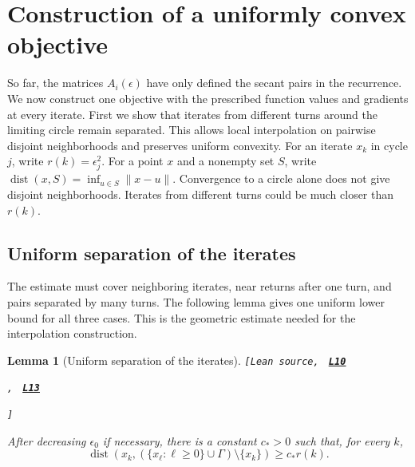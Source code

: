 \documentclass[11pt]{article}
\newtheorem{lemma}[theorem]{Lemma}
\newcommand{\leanLinkText}[1]{%
  \underline{\textbf{#1}}%
}
\newcommand{\leanSnapshot}{e308927f5b7930bdd002f0c0e42b9d112ad821cb}
\newcommand{\leanDeclTag}[2]{%
  {\footnotesize\texttt{[Lean source, }}%
  \href{https://github.com/imathwy/DFP_wolfe_local/blob/\leanSnapshot/#1?plain=1\#L#2}%
    {\leanLinkText{\footnotesize\texttt{L#2}}}%
}
\newcommand{\leanDeclTagExtra}[2]{%
  \unskip
  {\footnotesize\texttt{, }}%
  \href{https://github.com/imathwy/DFP_wolfe_local/blob/\leanSnapshot/#1?plain=1\#L#2}%
    {\leanLinkText{\footnotesize\texttt{L#2}}}\allowbreak
}
\newcommand{\leanDeclTagEnd}{%
  \unskip
  {\footnotesize\texttt{]}}\enspace
}
\begin{document}
\section{Construction of a uniformly convex objective}
\label{sec:global-objective}

So far, the matrices $A_i(\epsilon)$ have only defined the secant pairs in the
recurrence.  We now construct one objective with the prescribed function
values and gradients at every iterate.  First we show that iterates from
different turns around the limiting circle remain separated.  This allows
local interpolation on pairwise disjoint neighborhoods and preserves uniform
convexity.  For an iterate $x_k$ in cycle $j$, write $r(k)=\epsilon_j^2$.
For a point $x$ and a nonempty set $S$, write
$\operatorname{dist}(x,S)=\inf_{u\in S}\|x-u\|$.
Convergence to a circle alone does not give disjoint neighborhoods.  Iterates
from different turns could be much closer than $r(k)$.

\subsection{Uniform separation of the iterates}

The estimate must cover neighboring iterates, near returns after one turn, and
pairs separated by many turns.  The following lemma gives one uniform lower
bound for all three cases.  This is the geometric estimate needed for the
interpolation construction.

\begin{lemma}[Uniform separation of the iterates]\label{lem:separation}
\leanDeclTag{DFPWolfe/A_uniformly_convex_counterexample_to_global_convergence_of_DFP_under_weak_Wolfe_/Lemma_Uniform_separation.lean}{10}
\leanDeclTagExtra{DFPWolfe/A_uniformly_convex_counterexample_to_global_convergence_of_DFP_under_weak_Wolfe_/Lemma_4_21_Uniform_all_pairs_endpoint_separation.lean}{13}
\leanDeclTagEnd
After decreasing $\epsilon_0$ if necessary, there is a constant $c_*>0$ such
that, for every $k$,
\begin{equation}\label{eq:separation}
\operatorname{dist}\!\left(
x_k,(\{x_\ell:\ell\ge0\}\cup\Gamma)\setminus\{x_k\}
\right)
\ge c_*r(k).
\end{equation}
\end{lemma}
\end{document}
